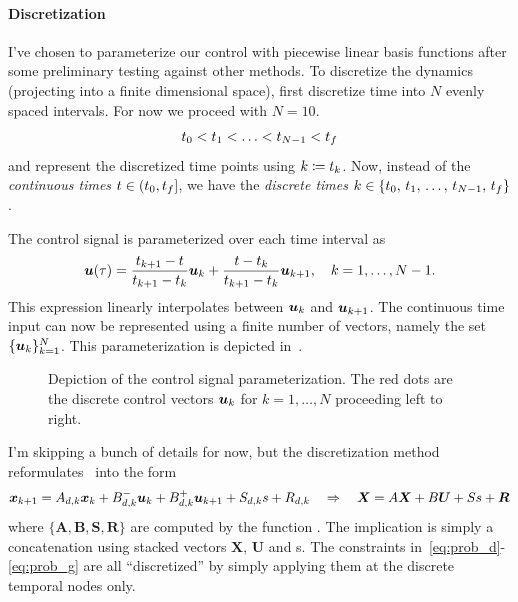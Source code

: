 \documentclass[10pt]{article}
\begin{document}
\paragraph{Discretization}

I've chosen to parameterize our control with piecewise linear basis functions after some preliminary testing against other methods. To discretize the dynamics (projecting into a finite dimensional space), first discretize time into $N$ evenly spaced intervals. For now we proceed with $N=10$. 
\begin{equation}
t_0 < t_1 < \ldots < t_{N-1} < t_f
\end{equation}
and represent the discretized time points using $k \coloneqq t_k$. Now, instead of the \textit{continuous times} $t\in(t_0,t_f]$, we have the \textit{discrete times} $k\in\{t_0,\,t_1,\,\ldots,\,t_{N-1},\,t_f\}$.

The control signal is parameterized over each time interval as
\begin{equation}
\bm{u}(\tau) = \frac{t_{k+1} - t}{t_{k+1}-t_k} \bm{u}_k + \frac{t-t_k}{t_{k+1}-t_k} \bm{u}_{k+1}, \quad k=1,\ldots,N-1.
\end{equation}
This expression linearly interpolates between $\bm{u}_k$ and $\bm{u}_{k+1}$. The continuous time input can now be represented using a finite number of vectors, namely the set $\{\bm{u}_{k}\}_{k=1}^{N}$. This parameterization is depicted in~.

\begin{figure}
\centering
\caption{Depiction of the control signal parameterization. The red dots are the discrete control vectors $\bm{u}_{k}$ for $k=1,\ldots,N$ proceeding left to right.}
\label{fig:ctrl_param}
\end{figure}

I'm skipping a bunch of details for now, but the discretization method reformulates~ into the form
\begin{equation}
\bm{x}_{k+1} = A_{d,k} \bm{x}_{k} + B_{d,k}^- \bm{u}_k + B_{d,k}^+ \bm{u}_{k+1} + S_{d,k} s + R_{d,k} \quad \Rightarrow \quad \bm{X} = A \bm{X} + B \bm{U} + S s + \bm{R}
\label{eq:discrete_dynamics}
\end{equation}
where $\{\bm{A},\bm{B},\bm{S},\bm{R}\}$ are computed by the function . The implication is simply a concatenation using stacked vectors $\bm{X},\,\bm{U}$ and s. The constraints in~\eqref{eq:prob_d}-\eqref{eq:prob_g} are all ``discretized'' by simply applying them at the discrete temporal nodes only. 
\end{document}
